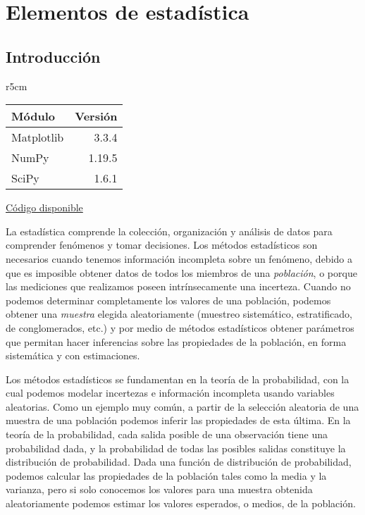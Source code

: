 

\chapter{Elementos de estadística} \label{ch:estadistica}   


\section{Introducción}

\begin{wraptable}{r}{5cm}
\begin{modulesinfo}
\begin{center}
{\small
    \begin{tabular}{l r}
        \toprule
        \textbf{Módulo} & \textbf{Versión} \\
        \midrule
        Matplotlib & 3.3.4 \\
        NumPy & 1.19.5 \\
        SciPy & 1.6.1 \\
        \bottomrule
    \end{tabular}
    \vspace{0.75em}
    
    \href{https://github.com/facundobatista/libro-pyciencia/tree/master/código/estadistica/}{Código disponible}
}
\end{center}
\end{modulesinfo}
\end{wraptable}

La estadística comprende la colección, organización y análisis de datos para comprender fenómenos y tomar decisiones. Los métodos estadísticos son necesarios cuando tenemos información incompleta sobre un fenómeno, debido a que es imposible obtener datos de todos los miembros de una \textit{población}, o porque las mediciones que realizamos poseen intrínsecamente una incerteza. Cuando no podemos determinar completamente los valores de una población, podemos obtener una \textit{muestra} elegida aleatoriamente (muestreo sistemático, estratificado, de conglomerados, etc.) y por medio de métodos estadísticos obtener parámetros que permitan hacer inferencias sobre las propiedades de la población, en forma sistemática y con estimaciones.

Los métodos estadísticos se fundamentan en la teoría de la probabilidad, con la cual podemos modelar incertezas e información incompleta usando variables aleatorias. Como un ejemplo muy común, a partir de la selección aleatoria de una muestra de una población podemos inferir las propiedades de esta última. En la teoría de la probabilidad, cada salida posible de una observación tiene una probabilidad dada, y la probabilidad de todas las posibles salidas constituye la distribución de probabilidad. Dada una función de distribución de probabilidad, podemos calcular las propiedades de la población tales como la media y la varianza, pero si solo conocemos los valores para una muestra obtenida aleatoriamente  podemos estimar los valores esperados, o medios, de la población.

